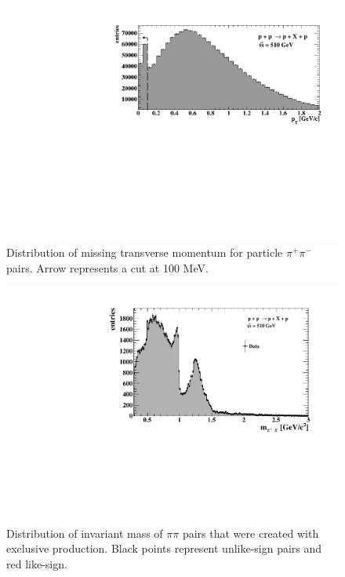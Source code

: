 \FloatBarrier
\begin{figure}[ht]
    \centering
    \includegraphics[width=1\textwidth]{figures/hPtMissingK0s.pdf}
    \caption[Distribution of missing transverse momentum for $\pi \pi$ pairs]{Distribution of missing transverse momentum for particle $\pi^+ \pi^-$ pairs. Arrow represents a cut at 100 MeV.}
    \label{af49}
\end{figure}
\FloatBarrier

\FloatBarrier
\begin{figure}[ht]
    \centering
    \includegraphics[width=1\textwidth]{figures/invMassPiPiexclusive.pdf}
    \caption[Distribution of invariant mass of exclusively produced $\pi \pi$ pairs]{Distribution of invariant mass of $\pi \pi$ pairs that were created with exclusive production. Black points represent unlike-sign pairs and red like-sign.}
    \label{af50}
\end{figure}
\FloatBarrier

